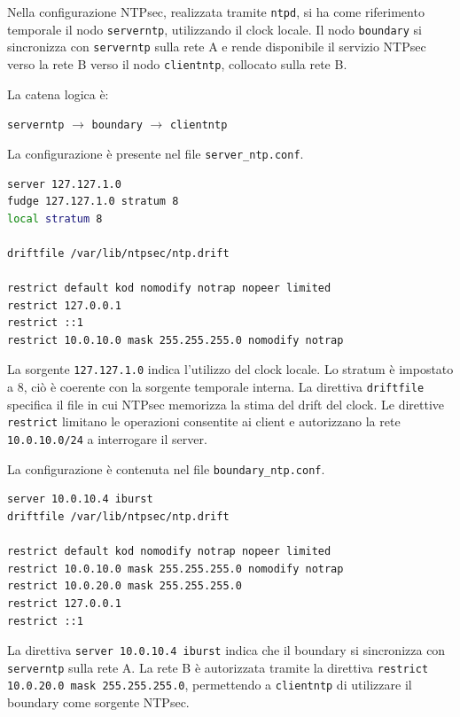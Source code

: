 Nella configurazione NTPsec, realizzata tramite \texttt{ntpd}, si ha come
riferimento temporale il nodo \texttt{serverntp}, utilizzando il clock locale. Il
nodo \texttt{boundary} si sincronizza con \texttt{serverntp} sulla rete A e rende
disponibile il servizio NTPsec verso la rete B verso il nodo \texttt{clientntp}, collocato
sulla rete B.

La catena logica è:

\begin{center}
  \texttt{serverntp} $\rightarrow$ \texttt{boundary} $\rightarrow$ \texttt{clientntp}
\end{center}

La configurazione è presente nel file \texttt{server\_ntp.conf}.

\begin{lstlisting}[language=bash,caption={Configurazione NTPsec del nodo serverntp.},label={lst:ntpsec-server}]
server 127.127.1.0
fudge 127.127.1.0 stratum 8
local stratum 8

driftfile /var/lib/ntpsec/ntp.drift

restrict default kod nomodify notrap nopeer limited
restrict 127.0.0.1
restrict ::1
restrict 10.0.10.0 mask 255.255.255.0 nomodify notrap
\end{lstlisting}

La sorgente \texttt{127.127.1.0} indica l'utilizzo del clock locale. Lo stratum
è impostato a 8, ciò è coerente con la sorgente temporale interna. La direttiva
\texttt{driftfile} specifica il file in cui NTPsec memorizza la stima del drift del
clock. Le direttive \texttt{restrict} limitano le operazioni consentite ai client
e autorizzano la rete \texttt{10.0.10.0/24} a interrogare il server.

La configurazione è contenuta nel file \texttt{boundary\_ntp.conf}.

\begin{lstlisting}[language=bash,caption={Configurazione NTPsec del nodo boundary.},label={lst:ntpsec-boundary}]
server 10.0.10.4 iburst
driftfile /var/lib/ntpsec/ntp.drift

restrict default kod nomodify notrap nopeer limited
restrict 10.0.10.0 mask 255.255.255.0 nomodify notrap
restrict 10.0.20.0 mask 255.255.255.0
restrict 127.0.0.1
restrict ::1
\end{lstlisting}

La direttiva \texttt{server 10.0.10.4 iburst} indica che il boundary si sincronizza
con \texttt{serverntp} sulla rete A. La rete B è autorizzata tramite la direttiva
\texttt{restrict 10.0.20.0 mask 255.255.255.0}, permettendo a \texttt{clientntp}
di utilizzare il boundary come sorgente NTPsec.

